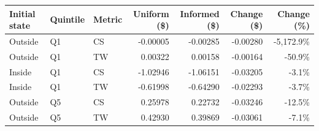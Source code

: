 \documentclass[11pt]{article}
\begin{document}
\begin{center}
\renewcommand{\arraystretch}{1.4}
\begin{tabular}{lllrrrr}
\toprule
Initial state & Quintile & Metric & Uniform (\$) & Informed (\$) & Change (\$) & Change (\%)\\
\midrule
Outside & Q1 & CS & -0.00005 & -0.00285 & -0.00280 & -5,172.9\% \\
Outside & Q1 & TW & 0.00322 & 0.00158 & -0.00164 & -50.9\% \\
\addlinespace
Inside & Q1 & CS & -1.02946 & -1.06151 & -0.03205 & -3.1\% \\
Inside & Q1 & TW & -0.61998 & -0.64290 & -0.02293 & -3.7\% \\
\addlinespace
Outside & Q5 & CS & 0.25978 & 0.22732 & -0.03246 & -12.5\% \\
Outside & Q5 & TW & 0.42930 & 0.39869 & -0.03061 & -7.1\% \\
\bottomrule
\end{tabular}
\end{center}
\end{document}
